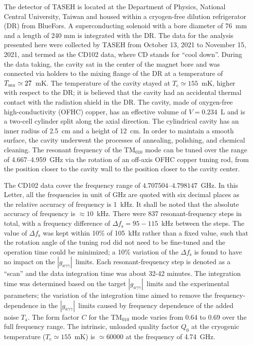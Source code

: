 \documentclass[%
 reprint,prl, %
 amsmath,amssymb,
 aps,
]{revtex4-2}
\newcommand{\gagg}{\ensuremath{\left|g_{a\gamma\gamma}\right|}}
\newcommand{\ta}{\ensuremath{T_\text{a}}}
\newcommand{\flo}{\ensuremath{4.707504}}
\newcommand{\fhi}{\ensuremath{4.798147}}
\begin{document}
The detector of TASEH is located at the Department of Physics, National 
Central University, Taiwan and housed within a cryogen-free dilution 
refrigerator (DR) from BlueFors. A superconducting solenoid 
with a 
bore diameter of 76~mm and a length of 240 mm is integrated with the DR. 
%
The data for the analysis presented here were collected by TASEH 
from October 13, 2021 to November 15, 2021, and termed as the CD102 data, 
where CD stands for ``cool down''. 
During the data taking, the cavity sat in the center of the magnet bore 
and was connected via holders to the mixing flange of the DR at a 
temperature of $T_{\rm mx}\simeq27$~mK. 
The temperature of the cavity stayed at $T_\text{c}\simeq155$~mK, higher 
with respect to the 
DR; it is believed that the cavity had an accidental thermal contact with the 
radiation shield in the DR. 
The cavity, made of oxygen-free high-conductivity (OFHC) copper, has an 
effective volume of $V=0.234$~L and is a two-cell cylinder split along 
the axial direction. 
The cylindrical cavity has an inner radius of 2.5~cm and a 
height of 12~cm.  In order to maintain a smooth surface, the cavity underwent 
the processes of annealing, polishing, and chemical cleaning. The resonant 
frequency of the TM$_{010}$ mode can be tuned over the range of 
4.667--4.959~GHz via the rotation of an off-axis OFHC copper tuning rod, from 
the position closer to the cavity wall to the position closer to the cavity 
center. 

The CD102 data cover the frequency range of \flo--\fhi~GHz. In this Letter, 
all the frequencies in unit of GHz are quoted with six decimal places as the 
relative accuracy of frequency is 1~kHz. It shall be noted that the 
absolute accuracy of frequency is $\approx 10$~kHz.  
There were 837 resonant-frequency steps in total, with a frequency difference 
of $\Delta f_\text{s}=95-115$~kHz between the steps. The value of 
$\Delta f_\text{s}$ was kept within 10\% of 105~kHz rather than 
a fixed value, such that the rotation angle of the tuning rod did not need to 
be fine-tuned and the operation time could be minimized; a 10\% variation of 
the $\Delta f_\text{s}$ is found to have no impact on the \gagg\ limits. 
Each resonant-frequency step is denoted as a ``scan'' 
and the data integration time was about 32-42 minutes. The integration 
time was determined based on the target \gagg\ limits and the experimental 
parameters; the variation of the integration 
time aimed to remove the frequency-dependence in the \gagg\ limits caused by   
frequency dependence of the added noise \ta. The form factor $C$ for 
the TM$_{010}$ mode varies from 0.64 to 0.69 over the 
full frequency range.  
The intrinsic, unloaded quality factor $Q_0$ at the cryogenic temperature 
($T_\mathrm{c}\simeq 155$~mK) is $\simeq 60000$ at the frequency of 
4.74~GHz.
\end{document}
